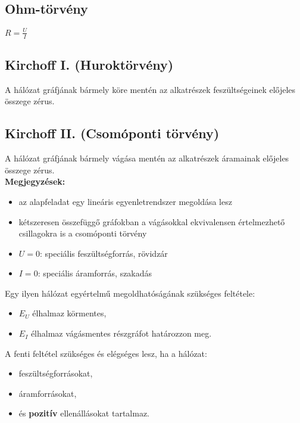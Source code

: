 \subsection*{Ohm-törvény}
$R=\frac{U}{I}$

\subsection*{Kirchoff I. (Huroktörvény)}
A hálózat gráfjának bármely köre mentén az alkatrészek feszültségeinek előjeles összege zérus.

\subsection*{Kirchoff II. (Csomóponti törvény)}
A hálózat gráfjának bármely vágása mentén az alkatrészek áramainak előjeles összege zérus.\\
\newline
\textbf{Megjegyzések:}
\begin{itemize}
\item az alapfeladat egy lineáris egyenletrendszer megoldása lesz
\item kétszeresen összefüggő gráfokban a vágásokkal ekvivalensen értelmezhető csillagokra is a csomóponti törvény
\item $U=0$: speciális feszültségforrás, rövidzár
\item $I=0$: speciális áramforrás, szakadás
\end{itemize}

\begin{lem}
Egy ilyen hálózat egyértelmű megoldhatóságának szükséges feltétele:
\begin{itemize}
\item $E_{U}$ élhalmaz körmentes,
\item $E_{I}$ élhalmaz vágásmentes részgráfot határozzon meg.
\end{itemize}
\end{lem}

\begin{theo}
A fenti feltétel szükséges és elégséges lesz, ha a hálózat:
\begin{itemize}
\item feszültségforrásokat,
\item áramforrásokat,
\item és \textbf{pozitív} ellenállásokat tartalmaz.
\end{itemize}
\end{theo}

